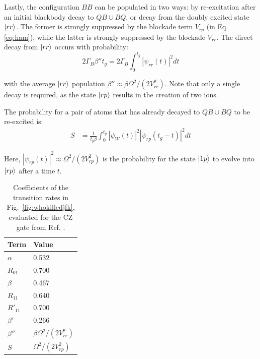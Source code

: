 \documentclass[%
reprint,
superscriptaddress,
 amsmath,amssymb,
 aps,
 prx,
floatfix,
]{revtex4-1}
\begin{document}
Lastly, the configuration $BB$ can be populated in two ways: by re-excitation after an initial blackbody decay to $QB \cup BQ$, or decay from the doubly excited state $\ket{rr}$. The former is strongly suppressed by the blockade term $V_{rp}$ (in Eq. \ref{eq:ham}), while the latter is strongly suppressed by the blockade $V_{rr}$. The direct decay from $\ket{rr}$ occurs with probability:
\begin{equation}
    2\Gamma_B \beta'' t_g = 2 \Gamma_B \int_0^{t_g} \left|\psi_{rr}(t)\right|^2 dt
\end{equation}

with the average $\ket{rr}$ population $\beta'' \approx \beta \Omega^2/(2 V^2_{rr})$. Note that only a single decay is required, as the state $\ket{rp}$ results in the creation of two ions.

The probability for a pair of atoms that has already decayed to $QB \cup BQ$ to be re-excited is:
\begin{equation}
\begin{split}
    S &= \frac{1}{t_g \beta} \int_0^{t_g} \left|\psi_W(t)\right|^2 \left|\psi_{rp}(t_g-t)\right|^2 dt
\end{split}
\end{equation}

Here, $|\psi_{rp}(t)|^2 \approx \Omega^2/(2 V_{rp}^2)$ is the probability for the state $\ket{1p}$ to evolve into $\ket{rp}$ after a time $t$.

\begin{table}[]
    \centering
    \begin{tabular}{l|l}
         Term & Value  \\
         \hline
         $\alpha$ & 0.532 \\
         $R_{01}$ & 0.700 \\
         \hline
         $\beta$ & 0.467 \\
         $R_{11}$ & 0.640 \\
         $R'_{11}$ & 0.700 \\
         $\beta'$ & 0.266 \\
         $\beta''$ & $\beta \Omega^2/(2 V^2_{rr})$ \\
         $S$ & $\Omega^2/(2 V_{rp}^2)$ \\
    \end{tabular}
    \caption{Coefficients of the transition rates in Fig.~\ref{fig:whokilledjfk}, evaluated for the CZ gate from Ref. \cite{Levine2019}.}
    \label{tab:decay_params}
\end{table}
\end{document}
